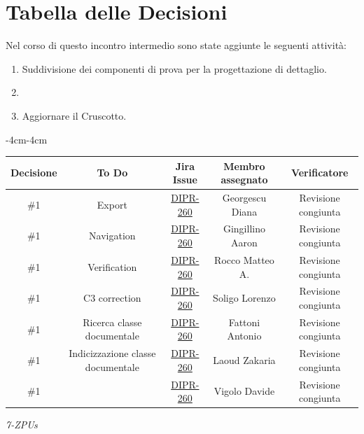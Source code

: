 \documentclass[a4paper,12pt]{article}
\begin{document}
\section{Tabella delle Decisioni}

Nel corso di questo incontro intermedio sono state aggiunte le seguenti attività:
\begin{enumerate}[noitemsep]
    \item Suddivisione dei componenti di prova per la progettazione di dettaglio.
    \item 
    \item Aggiornare il Cruscotto.
\end{enumerate}

\vspace{0.5cm}

\begin{table}[H]
    \begin{adjustwidth}{-4cm}{-4cm}
    \centering
\begin{tabular}{|c|c|c|c|c|}
    \hline
    \textbf{Decisione} & \textbf{To Do} & \textbf{Jira Issue} & \textbf{Membro assegnato} & \textbf{Verificatore} \\
    \hline
    \#1 & Export & \href{https://7zpus.atlassian.net/browse/DIPR-260}{DIPR-260} & Georgescu Diana & Revisione congiunta \\
    \hline
    \#1 & Navigation & \href{https://7zpus.atlassian.net/browse/DIPR-260}{DIPR-260} & Gingillino Aaron & Revisione congiunta \\
    \hline
    \#1 & Verification & \href{https://7zpus.atlassian.net/browse/DIPR-260}{DIPR-260} & Rocco Matteo A. & Revisione congiunta \\
    \hline
    \#1 & C3 correction & \href{https://7zpus.atlassian.net/browse/DIPR-260}{DIPR-260} & Soligo Lorenzo & Revisione congiunta \\
    \hline
    \#1 & Ricerca classe documentale & \href{https://7zpus.atlassian.net/browse/DIPR-260}{DIPR-260} & Fattoni Antonio & Revisione congiunta \\
    \hline
    \#1 & Indicizzazione classe documentale & \href{https://7zpus.atlassian.net/browse/DIPR-260}{DIPR-260} & Laoud Zakaria & Revisione congiunta \\
    \hline
    \#1 & & \href{https://7zpus.atlassian.net/browse/DIPR-260}{DIPR-260} & Vigolo Davide & Revisione congiunta \\
    \hline
\end{tabular}
    \end{adjustwidth}
\end{table}

\vfill
\begin{flushright}
    \textit{7-ZPUs}
\end{flushright}
\end{document}
